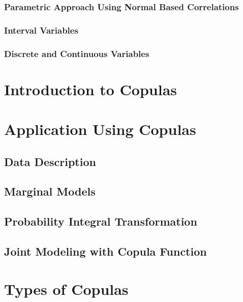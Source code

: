 \documentclass[]{book}
\theoremstyle{definition}
\theoremstyle{definition}
\theoremstyle{definition}
\theoremstyle{remark}
\begin{document}
\subsubsection{Parametric Approach Using Normal Based
Correlations}\label{parametric-approach-using-normal-based-correlations}

\subsubsection{Interval Variables}\label{interval-variables}

\subsubsection{Discrete and Continuous
Variables}\label{discrete-and-continuous-variables}

\section{Introduction to Copulas}\label{S:Copula}

\section{Application Using Copulas}\label{S:CopAppl}

\subsection{Data Description}\label{data-description}

\subsection{Marginal Models}\label{marginal-models}

\subsection{Probability Integral
Transformation}\label{probability-integral-transformation}

\subsection{Joint Modeling with Copula
Function}\label{joint-modeling-with-copula-function}

\section{Types of Copulas}\label{S:CopTyp}
\end{document}
